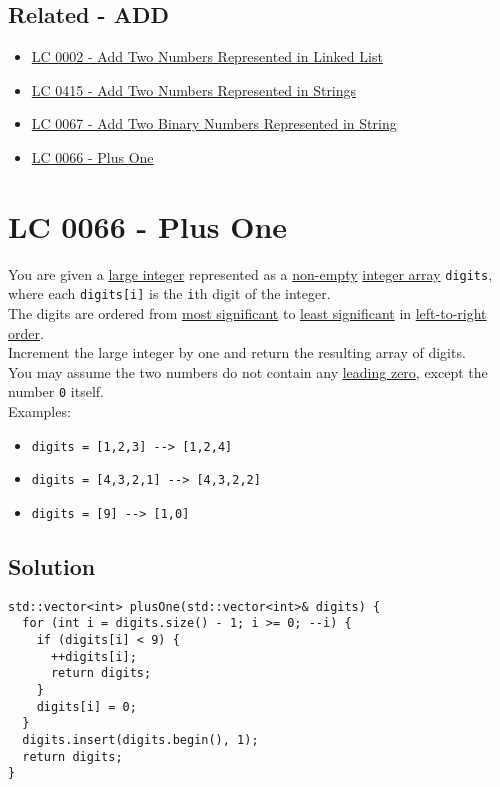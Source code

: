 \subsection*{Related - ADD}
\begin{itemize}
\item \hyperref[lc0002]{LC 0002 - Add Two Numbers Represented in Linked List}
\item \hyperref[lc0415]{LC 0415 - Add Two Numbers Represented in Strings}
\item \hyperref[lc0067]{LC 0067 - Add Two Binary Numbers Represented in String}
\item \hyperref[lc0066]{LC 0066 - Plus One}
\end{itemize}

\section{LC 0066 - Plus One}\label{lc0066}
You are given a \ul{large integer} represented as a \ul{non-empty} \ul{integer array} {\colorbox{CodeBackground}{\lstinline|digits|}}, where each {\colorbox{CodeBackground}{\lstinline|digits[i]|}} is the {\colorbox{CodeBackground}{\lstinline|i|}}th digit of the integer. \\

The digits are ordered from \ul{most significant} to \ul{least significant} in \ul{left-to-right order}. \\

Increment the large integer by one and return the resulting array of digits.\\

You may assume the two numbers do not contain any \ul{leading zero}, except the number {\colorbox{CodeBackground}{\lstinline|0|}} itself.\\

Examples:
\begin{itemize}
\item {\colorbox{CodeBackground}{\lstinline|digits = [1,2,3] --> [1,2,4]|}}
\item {\colorbox{CodeBackground}{\lstinline|digits = [4,3,2,1] --> [4,3,2,2]|}}
\item {\colorbox{CodeBackground}{\lstinline|digits = [9] --> [1,0]|}}
\end{itemize}

\subsection*{Solution}
\begin{lstlisting}
std::vector<int> plusOne(std::vector<int>& digits) {
  for (int i = digits.size() - 1; i >= 0; --i) {
    if (digits[i] < 9) {
      ++digits[i];
      return digits;
    }
    digits[i] = 0;
  }
  digits.insert(digits.begin(), 1);
  return digits;
}
\end{lstlisting}

